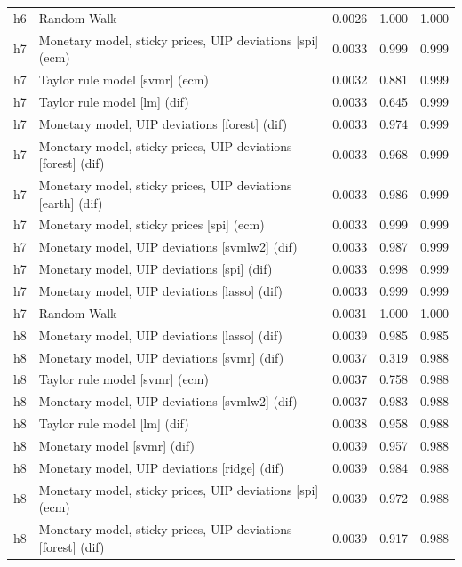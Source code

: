 \begin{ThreePartTable}
\begin{longtable}[t]{cp{5.5cm}ccc}
h6 & \raggedright Random Walk & 0.0026 & 1.000 & 1.000\\
\addlinespace
h7 & \raggedright Monetary model, sticky prices, UIP deviations [spi] (ecm) & 0.0033 & 0.999 & 0.999\\
h7 & \raggedright Taylor rule model [svmr] (ecm) & 0.0032 & 0.881 & 0.999\\
h7 & \raggedright Taylor rule model [lm] (dif) & 0.0033 & 0.645 & 0.999\\
h7 & \raggedright Monetary model, UIP deviations [forest] (dif) & 0.0033 & 0.974 & 0.999\\
h7 & \raggedright Monetary model, sticky prices, UIP deviations [forest] (dif) & 0.0033 & 0.968 & 0.999\\
h7 & \raggedright Monetary model, sticky prices, UIP deviations [earth] (dif) & 0.0033 & 0.986 & 0.999\\
h7 & \raggedright Monetary model, sticky prices [spi] (ecm) & 0.0033 & 0.999 & 0.999\\
h7 & \raggedright Monetary model, UIP deviations [svmlw2] (dif) & 0.0033 & 0.987 & 0.999\\
h7 & \raggedright Monetary model, UIP deviations [spi] (dif) & 0.0033 & 0.998 & 0.999\\
h7 & \raggedright Monetary model, UIP deviations [lasso] (dif) & 0.0033 & 0.999 & 0.999\\
h7 & \raggedright Random Walk & 0.0031 & 1.000 & 1.000\\
\addlinespace
h8 & \raggedright Monetary model, UIP deviations [lasso] (dif) & 0.0039 & 0.985 & 0.985\\
h8 & \raggedright Monetary model, UIP deviations [svmr] (dif) & 0.0037 & 0.319 & 0.988\\
h8 & \raggedright Taylor rule model [svmr] (ecm) & 0.0037 & 0.758 & 0.988\\
h8 & \raggedright Monetary model, UIP deviations [svmlw2] (dif) & 0.0037 & 0.983 & 0.988\\
h8 & \raggedright Taylor rule model [lm] (dif) & 0.0038 & 0.958 & 0.988\\
h8 & \raggedright Monetary model [svmr] (dif) & 0.0039 & 0.957 & 0.988\\
h8 & \raggedright Monetary model, UIP deviations [ridge] (dif) & 0.0039 & 0.984 & 0.988\\
h8 & \raggedright Monetary model, sticky prices, UIP deviations [spi] (ecm) & 0.0039 & 0.972 & 0.988\\
h8 & \raggedright Monetary model, sticky prices, UIP deviations [forest] (dif) & 0.0039 & 0.917 & 0.988\\

\end{longtable}
\end{ThreePartTable}
